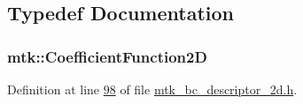 \subsection{Typedef Documentation}
\hypertarget{group__c07-mim__ops_gad9e1c0ace886b0029aefffa5f320e852}{
\subsubsection[{Coefficient\+Function2\+D}]{\setlength{\rightskip}{0pt plus 5cm}mtk\+::\+Coefficient\+Function2\+D}}\label{group__c07-mim__ops_gad9e1c0ace886b0029aefffa5f320e852}


Definition at line \hyperlink{mtk__bc__descriptor__2d_8h_source_l00098}{98} of file \hyperlink{mtk__bc__descriptor__2d_8h_source}{mtk\+\_\+bc\+\_\+descriptor\+\_\+2d.\+h}.

